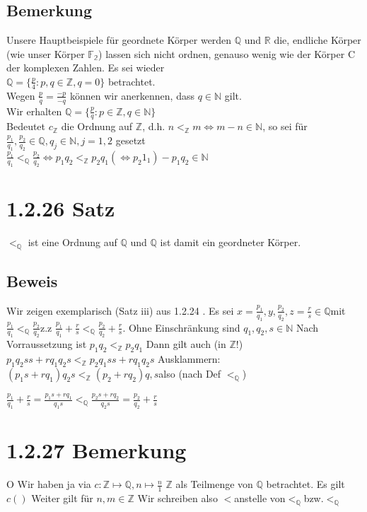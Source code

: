 \documentclass[11pt]{scrartcl}
\begin{document}
\subsection*{Bemerkung}
Unsere Hauptbeispiele für geordnete Körper werden $\mathbb{Q}$ und $\mathbb{R}$ die, endliche Körper (wie unser Körper $\mathbb{F_{2}}$) lassen sich nicht ordnen, genauso wenig wie der Körper C der komplexen Zahlen. Es sei wieder \\
 $\mathbb{Q} = \{ \frac{p}{4} : p,q \in \mathbb{Z},q=0\}$ betrachtet.\\ 
 Wegen $\frac{p}{q} = \frac{-p}{-q} $ können wir anerkennen, dass $q\in \mathbb{N}$ gilt. \\
 Wir erhalten $\mathbb{Q} = \{ \frac{p}{q} : p \in \mathbb{Z} , q \in \mathbb{N} \}$ \\
 Bedeutet $c_{\mathbb{Z}}$ die Ordnung auf $\mathbb{Z}$, d.h. $n<_{\mathbb{Z}}m \iff m-n \in \mathbb{N}$, so sei für \\ $\frac{p_1}{q_1} , \frac{p_2}{q_2} \in \mathbb{Q} , q_j \in \mathbb{N} , j=1,2$ gesetzt \\
 $\frac{p_1}{q_1} <_{\mathbb{Q}} \frac{p_2}{q_2} \iff p_1 q_2 <_{\mathbb{Z}} p_2 q_1 (\iff p_2 1_1) - p_1 q_2 \in \mathbb{N}$
	
\section{1.2.26 Satz}
$<_{\mathbb{Q}}$ ist eine Ordnung auf $\mathbb{Q}$ und $\mathbb{Q}$ ist damit ein geordneter Körper.

\subsection*{Beweis}
Wir zeigen exemplarisch (Satz iii) aus 1.2.24 .
Es sei $x = \frac{p_1}{q_1} , y , \frac{p_2}{q_2} , z = \frac{r}{s} \in \mathbb{Q}$mit
$\frac{p_1}{q_1} <_{\mathbb{Q}} \frac{p_2}{q_2}$z.z $\frac{p_1}{q_1} + \frac{r}{s} <_{\mathbb{Q}} \frac{p_2}{q_2} + \frac{r}{s}$.
Ohne Einschränkung sind $q_1,q_2,s \in \mathbb{N}$ Nach Vorraussetzung ist $p_1 q_2 <_{\mathbb{Z}} p_2 q_1$ Dann gilt auch (in $\mathbb{Z}$!)
$p_1 q_2 s s+r q_1 q_2 s <_{\mathbb{Z}} p_2 q_1 s s+r q_1 q_2 s$
Ausklammern:
$(p_1 s+ r q_1) q_2  s <_{\mathbb{Z}} (p_2 + r q_2) q,s$also (nach Def $<_{\mathbb{Q}}$)

$\frac{p_1}{q_1}+ \frac{r}{s} = \frac{p_1 s + r q_1}{q_1 s} <_{\mathbb{Q}} \frac{p_2 s + r q_2}{q_2 s} = \frac{p_2}{q_2} + \frac{r}{s}$

\section{1.2.27 Bemerkung}O
Wir haben ja via $c : \mathbb{Z} \longmapsto \mathbb{Q}, n \longmapsto \frac{n}{1}$
$\mathbb{Z}$ als Teilmenge von $\mathbb{Q}$ betrachtet. Es gilt $c()$ Weiter gilt für $n,m \in \mathbb{Z} $
Wir schreiben also $< $anstelle von$ <_{\mathbb{Q}} $bzw.$ <_{\mathbb{Q}}$
\end{document}

